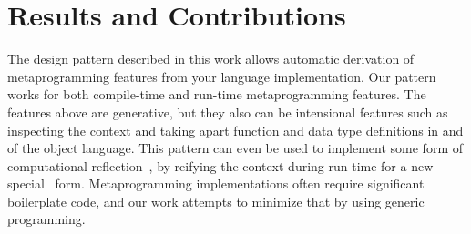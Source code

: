 \section{Results and Contributions}

The design pattern described in this work allows automatic derivation of metaprogramming features from your language implementation.
Our pattern works for both compile-time and run-time metaprogramming features.
The features above are generative, but they also can be intensional features
such as inspecting the context and taking apart function and data type
definitions in and of the object language. This pattern can even be used to
implement some form of computational
reflection~\cite{bcSmith,reflectionMasses}, by reifying the context during
run-time for a new special \textlambda\ form.
Metaprogramming implementations often require significant boilerplate code, and
our work attempts to minimize that by using generic programming.




